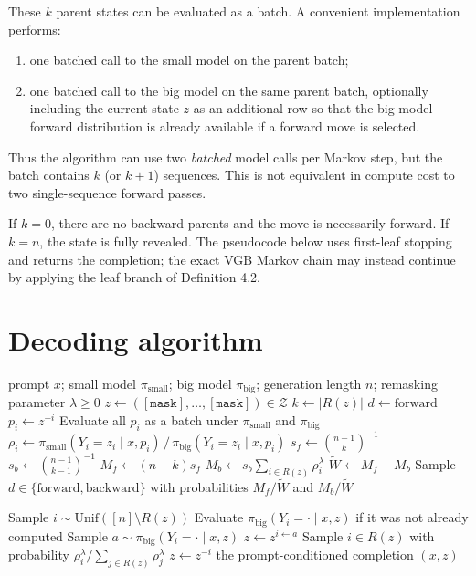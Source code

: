 \documentclass[11pt]{article}
\newcommand{\pb}{\pi_{\mathrm{big}}}
\newcommand{\ps}{\pi_{\mathrm{small}}}
\newcommand{\Z}{\mathcal{Z}}
\newcommand{\R}{R}
\newcommand{\mask}{\mathtt{[mask]}}
\newcommand{\Wt}{\widetilde W}
\begin{document}
These $k$ parent states can be evaluated as a batch. A convenient implementation performs:
\begin{enumerate}[leftmargin=2em]
\item one batched call to the small model on the parent batch;
\item one batched call to the big model on the same parent batch, optionally including the current state $z$ as an additional row so that the big-model forward distribution is already available if a forward move is selected.
\end{enumerate}
Thus the algorithm can use two \emph{batched} model calls per Markov step, but the batch contains $k$ (or $k+1$) sequences. This is not equivalent in compute cost to two single-sequence forward passes.

If $k=0$, there are no backward parents and the move is necessarily forward. If $k=n$, the state is fully revealed. The pseudocode below uses first-leaf stopping and returns the completion; the exact VGB Markov chain may instead continue by applying the leaf branch of Definition 4.2.

\section{Decoding algorithm}

\begin{algorithm}[H]
\caption{Density-Ratio VGB Decoding, Singleton Moves ($r=1$)}
\label{alg:density-ratio-vgb}
\begin{algorithmic}[1]
\Require prompt $x$; small model $\ps$; big model $\pb$; generation length $n$; remasking parameter $\lambda\ge 0$
\State $z\gets(\mask,\ldots,\mask)\in\Z$
\While{$|\R(z)|<n$}
    \State $k\gets|\R(z)|$
        \State $d\gets\mathrm{forward}$
    \Else
        \ForAll{$i\in\R(z)$}
            \State $p_i\gets z^{-i}$
        \EndFor
        \State Evaluate all $p_i$ as a batch under $\ps$ and $\pb$
        \ForAll{$i\in\R(z)$}
            \State $\rho_i\gets \ps(Y_i=z_i\mid x,p_i)\,/\,\pb(Y_i=z_i\mid x,p_i)$
        \EndFor
        \State $s_f\gets\binom{n-1}{k}^{-1}$
        \State $s_b\gets\binom{n-1}{k-1}^{-1}$
        \State $M_f\gets(n-k)s_f$
        \State $M_b\gets s_b\sum_{i\in\R(z)}\rho_i^\lambda$
        \State $\Wt\gets M_f+M_b$
        \State Sample $d\in\{\mathrm{forward},\mathrm{backward}\}$ with probabilities $M_f/\Wt$ and $M_b/\Wt$
    \EndIf

        \State Sample $i\sim\mathrm{Unif}([n]\setminus\R(z))$
        \State Evaluate $\pb(Y_i=\cdot\mid x,z)$ if it was not already computed
        \State Sample $a\sim\pb(Y_i=\cdot\mid x,z)$
        \State $z\gets z^{i\leftarrow a}$
    \Else
        \State Sample $i\in\R(z)$ with probability $\rho_i^\lambda/\sum_{j\in\R(z)}\rho_j^\lambda$
        \State $z\gets z^{-i}$
    \EndIf
\EndWhile
\State \Return the prompt-conditioned completion $(x,z)$
\end{algorithmic}
\end{algorithm}
\end{document}
